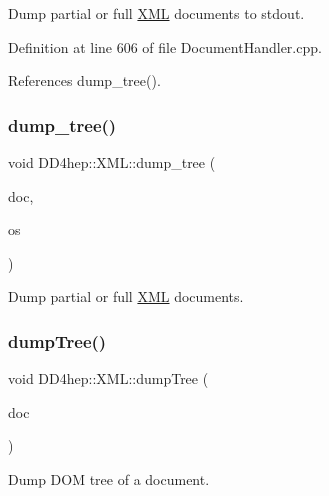 Dump partial or full \hyperlink{namespace_d_d4hep_1_1_x_m_l}{X\+ML} documents to stdout. 



Definition at line 606 of file Document\+Handler.\+cpp.



References dump\+\_\+tree().

\hypertarget{namespace_d_d4hep_1_1_x_m_l_afd8062f9a152e74ef2dee123cf47433e}{}\label{namespace_d_d4hep_1_1_x_m_l_afd8062f9a152e74ef2dee123cf47433e} 
\subsubsection{\texorpdfstring{dump\+\_\+tree()}{dump\_tree()}\hspace{0.1cm}{\footnotesize\ttfamily [6/6]}}
{\footnotesize\ttfamily void D\+D4hep\+::\+X\+M\+L\+::dump\+\_\+tree (\begin{DoxyParamCaption}\item[{\hyperlink{class_d_d4hep_1_1_x_m_l_1_1_document}{Document}}]{doc,  }\item[{std\+::ostream \&}]{os }\end{DoxyParamCaption})}



Dump partial or full \hyperlink{namespace_d_d4hep_1_1_x_m_l}{X\+ML} documents. 

\hypertarget{namespace_d_d4hep_1_1_x_m_l_a7cf74afac9d5989eb5eb2862e9ae78b3}{}\label{namespace_d_d4hep_1_1_x_m_l_a7cf74afac9d5989eb5eb2862e9ae78b3} 
\subsubsection{\texorpdfstring{dump\+Tree()}{dumpTree()}\hspace{0.1cm}{\footnotesize\ttfamily [1/2]}}
{\footnotesize\ttfamily void D\+D4hep\+::\+X\+M\+L\+::dump\+Tree (\begin{DoxyParamCaption}\item[{Xml\+Document $\ast$}]{doc }\end{DoxyParamCaption})}



Dump D\+OM tree of a document. 

